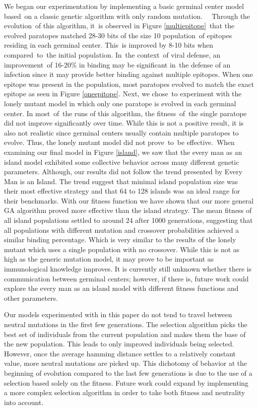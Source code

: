 \documentclass[conference]{IEEEtran}
\begin{document}
We began our experimentation by implementing a basic germinal center model based on a classic genetic algorithm with only random mutation.   Through the evolution of this algorithm, it is observed in Figure \ref{multiepitope} that the evolved paratopes matched 28-30 bits of the size 10 population of epitopes residing in each germinal center. This is improved by 8-10 bits when compared to the initial population. In the context of viral defense, an improvement of 16-20\% in binding may be significant in the defense of an infection since it may provide better binding against multiple epitopes. When one epitope was present in the population, most paratopes evolved to match the exact epitope as seen in Figure \ref{oneepitope}. Next, we chose to experiment with the lonely mutant model in which only one paratope is evolved in each germinal center. In most of the runs of this algorithm, the fitness of the single paratope did not improve significantly over time. While this is not a positive result, it is also not realistic since germinal centers usually contain multiple paratopes to evolve. Thus, the lonely mutant model did not prove to be effective. When examining our final model in Figure \ref{island}, we saw that the every man as an island model exhibited some collective behavior across many different genetic parameters. Although, our results did not follow the trend presented by Every Man is an Island\cite{b5}. The trend suggest that minimal island population size was their most effective strategy and that 64 to 128 islands was an ideal range for their benchmarks. With our fitness function we have shown that our more general GA algorithm proved more effective than the island strategy. The mean fitness of all island populations settled to around 24 after 1000 generations, suggesting that all populations with different mutation and crossover probabilities achieved a similar binding percentage. Which is very similar to the results of the lonely mutant which uses a single population with no crossover. While this is not as high as the generic mutation model, it may prove to be important as immunological knowledge improves. It is currently still unknown whether there is communication between germinal centers; however, if there is, future work could explore the every man as an island model with different fitness functions and other parameters. 

Our models experimented with in this paper do not tend to travel between neutral mutations in the first few generations. The selection algorithm picks the best set of individuals from the current population and makes them the base of the new population. This leads to only improved individuals being selected. However, once the average hamming distance settles to a relatively constant value, more neutral mutations are picked up. This dichotomy of behavior at the beginning of evolution compared to the last few generations is due to the use of a selection based solely on the fitness. Future work could expand by implementing a more complex selection algorithm in order to take both fitness and neutrality into account. 
\end{document}
